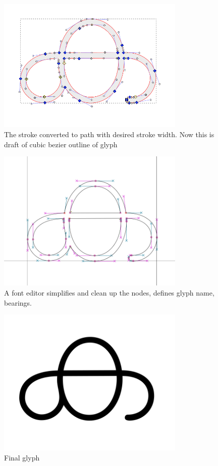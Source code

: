 \documentclass[11pt,twoside,a4paper,parskip=half]{scrartcl}
\begin{document}
\begin{figure}[h!]
	\includegraphics[width=0.8\textwidth]{images/design-2-stroke-to-path.png}
	\caption{The stroke converted to path with desired stroke width. Now this is draft of cubic bezier outline of glyph}
	\label{design-2}
\end{figure}

\begin{figure}[h!]
	\includegraphics[width=0.8\textwidth]{images/design-3-cubic-bezier-in-font-editor.png}
	\caption{A font editor simplifies and clean up the nodes, defines glyph name, bearings.}
	\label{design-3}
\end{figure}

\begin{figure}[h!]
	\includegraphics[width=0.8\textwidth]{images/design-4-final.png}
	\caption{Final glyph}
	\label{design-4}
\end{figure}
\end{document}
